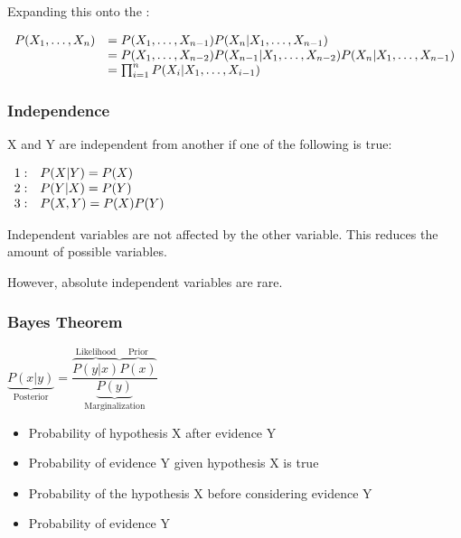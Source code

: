 \documentclass[
../EiKI_Summary.tex,
]
{subfiles}
\begin{document}
Expanding this onto the :

\begin{csmb*}
    $\begin{array}{r l}
        P(X_1, \ldots, X_n) &= P(X_1,\ldots, X_{n-1})P(X_n | X_1,\ldots, X_{n-1}) \\
        &= P(X_1,\ldots, X_{n-2})P(X_{n-1}|X_1,\ldots, X_{n-2})P(X_n | X_1,\ldots, X_{n-1}) \\
        &= \prod_{i=1}^{n} P(X_i | X_1,\ldots, X_{i-1})\\
    \end{array}$
\end{csmb*}

\subsubsection{Independence}
X and Y are independent from another if one of the following is true:

\begin{csmb*}
    $\begin{array}{c l}
        1: & P(X|Y) = P(X)\\
        2: & P(Y|X) = P(Y)\\
        3: & P(X,Y) = P(X)P(Y)\\
    \end{array}$
\end{csmb*}

Independent variables are not affected by the other variable. This reduces the amount of possible variables.

However, absolute independent variables are rare.

\subsubsection{Bayes Theorem}

\begin{csmb*}
    $\underbrace{P(x|y)}_{\text{Posterior}} = \dfrac{\overbrace{P(y|x)}^{\text{Likelihood}} \overbrace{P(x)}^{\text{Prior}}}{\underbrace{P(y)}_{\text{Marginalization}}}$
\end{csmb*}

\begin{itemize}
    \item {} Probability of hypothesis X after evidence Y
    \item {} Probability of evidence Y given hypothesis X is true
    \item {} Probability of the hypothesis X before considering evidence Y
    \item {} Probability of evidence Y
\end{itemize}
\end{document}
